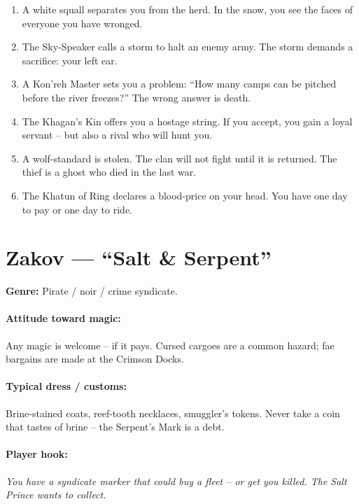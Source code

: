 \begin{tcolorbox}[colback=gray!5!white, colframe=gray!70!black, title=Ykrul Mini-Generator (d6),breakable]
\begin{enumerate}
\item A white squall separates you from the herd. In the snow, you see the faces of everyone you have wronged.
\item The Sky-Speaker calls a storm to halt an enemy army. The storm demands a sacrifice: your left ear.
\item A Kon'reh Master sets you a problem: ``How many camps can be pitched before the river freezes?'' The wrong answer is death.
\item The Khagan's Kin offers you a hostage string. If you accept, you gain a loyal servant -- but also a rival who will hunt you.
\item A wolf-standard is stolen. The clan will not fight until it is returned. The thief is a ghost who died in the last war.
\item The Khatun of Ring declares a blood-price on your head. You have one day to pay or one day to ride.
\end{enumerate}
\end{tcolorbox}

\section{Zakov --- ``Salt \& Serpent''}
\textbf{Genre:} Pirate / noir / crime syndicate.

\paragraph{Attitude toward magic:} Any magic is welcome -- if it pays. Cursed cargoes are a common hazard; fae bargains are made at the Crimson Docks.

\paragraph{Typical dress / customs:} Brine-stained coats, reef-tooth necklaces, smuggler's tokens. Never take a coin that tastes of brine -- the Serpent's Mark is a debt.

\paragraph{Player hook:} \emph{You have a syndicate marker that could buy a fleet -- or get you killed. The Salt Prince wants to collect.}

